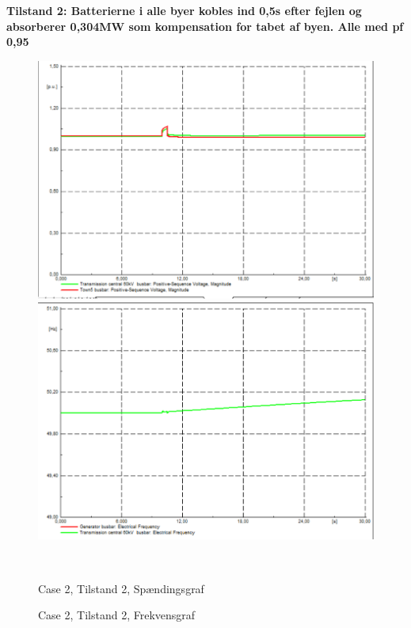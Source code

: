 \textbf{Tilstand 2: Batterierne i alle byer kobles ind 0,5s efter fejlen og absorberer 0,304MW som kompensation for tabet af byen. Alle med pf 0,95}
\begin{figure}[H]
	\centering
	\begin{minipage}[b]{0.48\textwidth}
		\centering
		\includegraphics[width=1.00\textwidth]{figurer/LossOfTown/Voltage2} %
	\end{minipage}
	\hfill
	\begin{minipage}[b]{0.48\textwidth}
		\centering
		\includegraphics[width=1.00\textwidth]{figurer/LossOfTown/Freq2} %
	\end{minipage}
	\\ %
	\begin{minipage}[t]{0.48\textwidth}
		\caption{Case 2, Tilstand 2, Spændingsgraf} %
		\label{fig:C2T2V}
	\end{minipage}
	\hfill
	\begin{minipage}[t]{0.48\textwidth}
		\caption{Case 2, Tilstand 2, Frekvensgraf} %
		\label{fig:C2T2F}
	\end{minipage}
\end{figure}

